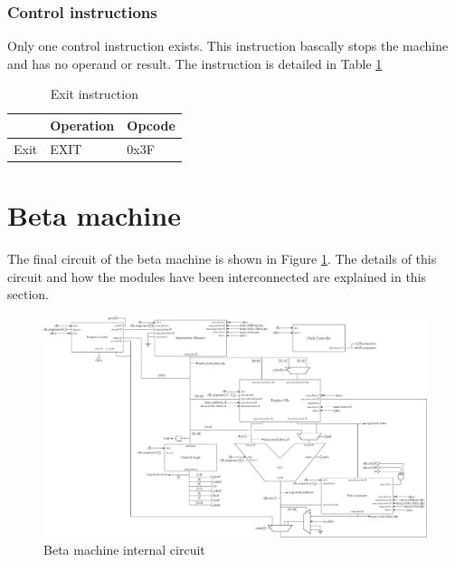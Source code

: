 \subsubsection*{Control instructions}

Only one control instruction exists. This instruction bascally stops the machine and has no operand
or result. The instruction is detailed in Table \ref{tab:instruction/ctrl}

\begin{table}[H]
    \centering
    \begin{tabular}{|l|l|l|}
    \hline
    \rowcolor[HTML]{DAE8FC} 
    \multicolumn{1}{|c|}{\cellcolor[HTML]{DAE8FC}\textbf{Name}} & \multicolumn{1}{c|}{\cellcolor[HTML]{DAE8FC}\textbf{Operation}} & \multicolumn{1}{c|}{\cellcolor[HTML]{DAE8FC}\textbf{Opcode}} \\ \hline
    Exit                                                        & EXIT                                                            & 0x3F                                                         \\ \hline
    \end{tabular}
    \caption{Exit instruction}
    \label{tab:instruction/ctrl}
\end{table}

\section{Beta machine}

The final circuit of the beta machine is shown in Figure \ref{fig:beta/all}. The details of this 
circuit and how the modules have been interconnected are explained in this section. 

\begin{figure}[H]
    \centering
    \includegraphics[width=\linewidth]{Chapter3-CPU/res/beta_machine_in}
    \caption{Beta machine internal circuit}
    \label{fig:beta/all}
\end{figure}

